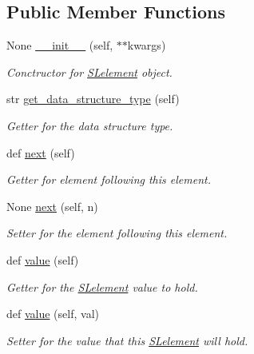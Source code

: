 \subsection*{Public Member Functions}
\begin{DoxyCompactItemize}
\item 
None \mbox{\hyperlink{classbridges_1_1sl__element_1_1_s_lelement_a0824caaa305931953bf3f6d53d3a3d14}{\+\_\+\+\_\+init\+\_\+\+\_\+}} (self, $\ast$$\ast$kwargs)
\begin{DoxyCompactList}\small\item\em Conctructor for \mbox{\hyperlink{classbridges_1_1sl__element_1_1_s_lelement}{S\+Lelement}} object. \end{DoxyCompactList}\item 
str \mbox{\hyperlink{classbridges_1_1sl__element_1_1_s_lelement_ae6d1c0479d0ed763e1ea54f5d2f9a0eb}{get\+\_\+data\+\_\+structure\+\_\+type}} (self)
\begin{DoxyCompactList}\small\item\em Getter for the data structure type. \end{DoxyCompactList}\item 
def \mbox{\hyperlink{classbridges_1_1sl__element_1_1_s_lelement_acef793fc5e2533fb91795d01904e8b6d}{next}} (self)
\begin{DoxyCompactList}\small\item\em Getter for element following this element. \end{DoxyCompactList}\item 
None \mbox{\hyperlink{classbridges_1_1sl__element_1_1_s_lelement_a210373939597f4c3bcc26fff98b4e44f}{next}} (self, n)
\begin{DoxyCompactList}\small\item\em Setter for the element following this element. \end{DoxyCompactList}\item 
def \mbox{\hyperlink{classbridges_1_1sl__element_1_1_s_lelement_a64ede02c56a4efaaa4c64a245bd01dd0}{value}} (self)
\begin{DoxyCompactList}\small\item\em Getter for the \mbox{\hyperlink{classbridges_1_1sl__element_1_1_s_lelement}{S\+Lelement}} value to hold. \end{DoxyCompactList}\item 
def \mbox{\hyperlink{classbridges_1_1sl__element_1_1_s_lelement_a7653b41a8bc2c8ba7a71f07c8b0b8f3f}{value}} (self, val)
\begin{DoxyCompactList}\small\item\em Setter for the value that this \mbox{\hyperlink{classbridges_1_1sl__element_1_1_s_lelement}{S\+Lelement}} will hold. \end{DoxyCompactList}\item 
$$
\end{DoxyCompactItemize}
